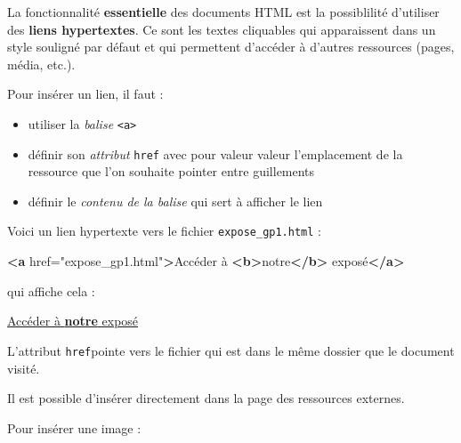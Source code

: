 \documentclass[a4paper,17pt]{extarticle}
\providecommand{\tightlist}{%
      \setlength{\itemsep}{0pt}\setlength{\parskip}{0pt}}
\newenvironment{Shaded}{}{}
\newcommand{\KeywordTok}[1]{\textcolor[rgb]{0.00,0.44,0.13}{\textbf{{#1}}}}
\newcommand{\StringTok}[1]{\textcolor[rgb]{0.25,0.44,0.63}{{#1}}}
\newcommand{\OtherTok}[1]{\textcolor[rgb]{0.00,0.44,0.13}{{#1}}}
\newcommand{\NormalTok}[1]{{#1}}
\begin{document}
    La fonctionnalité \textbf{essentielle} des documents HTML est la
possiblilité d'utiliser des \textbf{liens hypertextes}. Ce sont les
textes cliquables qui apparaissent dans un style souligné par défaut et
qui permettent d'accéder à d'autres ressources (pages, média, etc.).

Pour insérer un lien, il faut :

\begin{itemize}
\tightlist
\item
  utiliser la \emph{balise} \texttt{\textless{}a\textgreater{}}
\item
  définir son \emph{attribut} \texttt{href} avec pour valeur valeur
  l'emplacement de la ressource que l'on souhaite pointer entre
  guillements
\item
  définir le \emph{contenu de la balise} qui sert à afficher le lien
\end{itemize}
\begin{exemple}
    Voici un lien hypertexte vers le fichier \texttt{expose\_gp1.html} :

\begin{Shaded}
\begin{Highlighting}[]
\KeywordTok{\textless{}a}\OtherTok{ href=}\StringTok{"expose\_gp1.html"}\KeywordTok{\textgreater{}}\NormalTok{Accéder à }\KeywordTok{\textless{}b\textgreater{}}\NormalTok{notre}\KeywordTok{\textless{}/b\textgreater{}}\NormalTok{ exposé}\KeywordTok{\textless{}/a\textgreater{}}
\end{Highlighting}
\end{Shaded}

qui affiche cela :

\href{expose_gp1.html}{Accéder à \textbf{notre} exposé}

L'attribut \texttt{href}pointe vers le fichier qui est dans le même
dossier que le document visité.

            \end{exemple}
    Il est possible d'insérer directement dans la page des ressources
externes.

Pour insérer une image :
\end{document}
